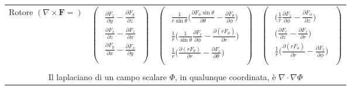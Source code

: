 \documentclass{book}
\newcommand{\h}{\mathbf}
\begin{document}
\begin{tabular}{|c|c|c|c|}
    {Rotore $(\nabla\times\h{F}=)$ }
    & {$\left( \begin{array}{c} \begin{aligned}
         \frac{\partial F_z}{\partial y}-\frac{\partial F_y}{\partial z} \\ 
         \frac{\partial F_x}{\partial z}-\frac{\partial F_z}{\partial x} \\ 
         \frac{\partial F_y}{\partial x}-\frac{\partial F_x}{\partial y} \\     
    \end{aligned} \end{array} \right) $}
    & {$\left(\begin{array}{c} \begin{aligned}
        \frac{1}{r \sin \theta} \biggl(\frac{\partial F_\phi \sin\theta}{\partial \theta}-\frac{\partial F_\theta}{\partial \phi}\biggr) \\
        \frac{1}{r}\biggl(\frac{1}{\sin\theta}\frac{\partial F_r}{\partial \phi}-\frac{\partial (r F_\phi)}{\partial r} \biggr) \\
        \frac{1}{r}\biggl(\frac{\partial (r F_\theta)}{\partial r}-\frac{\partial F_r}{\partial \theta}\biggr) \\       
    \end{aligned} \end{array}\right) $}
    & {$\left(\begin{array}{c} \begin{aligned}
        \biggl(\frac{1}{r}\frac{\partial F_z}{\partial \phi}-\frac{\partial F_\phi}{\partial z}\biggr) \\
        \biggl(\frac{\partial F_r}{\partial z}-\frac{\partial F_z}{\partial r} \biggr) \\
        \frac{1}{r}\biggl(\frac{\partial (r F_\phi)}{\partial r}-\frac{\partial F_r}{\partial \phi}\biggr) \\
    \end{aligned} \end{array}\right) $} \\
    & & & \\ \hline
    \multicolumn{4}{|c|}{Il laplaciano di un campo scalare $\Phi$, in qualunque coordinata, è $\nabla\cdot\nabla\Phi$} \\
    \hline
\end{tabular}
\end{document}

